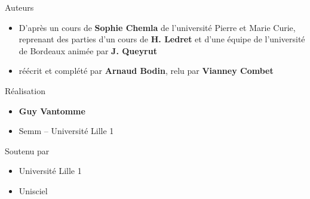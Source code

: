\begin{frame}
\begin{minipage}{0.90\textwidth}
   \smallskip
   
  Auteurs
  \begin{itemize}
    \item D'après un cours de {\bf Sophie Chemla} de l'université Pierre et Marie Curie,  
  reprenant des parties d'un cours de {\bf H. Ledret} et d'une équipe de l'université de 
  Bordeaux animée par {\bf J. Queyrut}
  
  
  \item réécrit et complété par {\bf Arnaud Bodin}, relu par {\bf Vianney Combet}
  
  
  \end{itemize}

  \smallskip

  Réalisation
  \begin{itemize}
    \item {\bf Guy Vantomme}
    \item Semm -- Université Lille 1
  \end{itemize}

  \smallskip

  Soutenu par 
  \begin{itemize}
    \item Université Lille 1
    \item Unisciel
  \end{itemize}

  \end{minipage}  



\end{frame}



